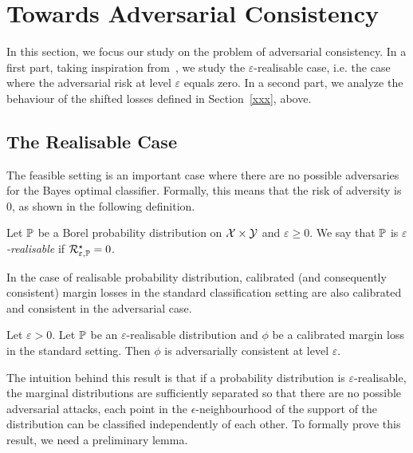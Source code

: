 \section{Towards Adversarial Consistency}
\label{sec:consistency}
In this section, we focus our study on the problem of adversarial consistency. In a first part, taking inspiration from~\citet{long2013consistency,awasthi2021calibration}, we study the $\varepsilon$-realisable case, i.e. the case where the adversarial risk at level $\varepsilon$ equals zero. In a second part, we analyze the behaviour of the shifted losses defined in Section~\ref{xxx}, above.



\subsection{The Realisable Case}
The feasible setting is an important case where there are no possible adversaries for the Bayes optimal classifier. Formally, this means that the risk of adversity is $0$, as shown in the following definition.

\begin{definition}
Let $\mathbb{P}$ be a Borel probability distribution on $\mathcal{X}\times\mathcal{Y}$ and $\varepsilon\geq0$. We say that $\mathbb{P}$ is \emph{$\varepsilon$-realisable} if $\mathcal{R}_{\varepsilon,\mathbb{P}}^\star = 0$.
\end{definition}


In the case of realisable probability distribution, calibrated (and consequently consistent) margin losses in the standard classification setting are also calibrated and consistent in the adversarial case. 
\begin{prop}
\label{prop:realizable} 
Let $\varepsilon>0$. Let $\mathbb{P}$ be an $\varepsilon$-realisable distribution and $\phi$ be a calibrated margin loss in the standard setting. Then $\phi$ is adversarially consistent at level $\varepsilon$. 
\end{prop}
The intuition behind this result is that if a probability distribution is $\varepsilon$-realisable, the marginal distributions are sufficiently separated so that there are no possible adversarial attacks, each point in the $\epsilon$-neighbourhood of the support of the distribution can be classified independently of each other. To formally prove this result, we need a preliminary lemma.


